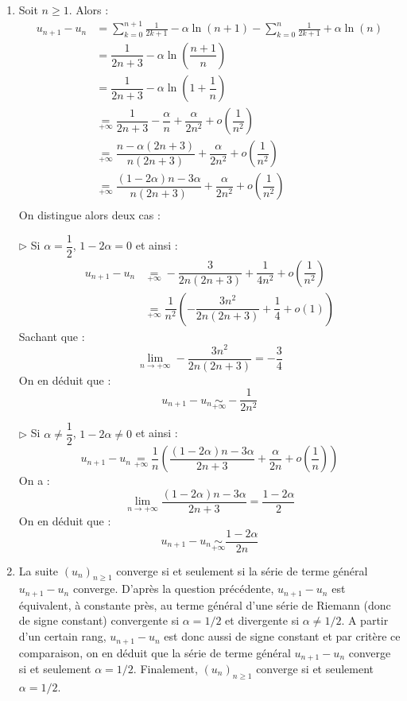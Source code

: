 \documentclass[a4paper,10pt]{report}
\begin{document}
\corr 

\begin{enumerate}
\item Soit $n \geq 1$. Alors :
\begin{align*}
u_{n+1}-u_n & = \sum_{k=0}^{n+1} \frac{1}{2k+1} -  \alpha \ln(n+1) -\sum_{k=0}^n \frac{1}{2k+1} + \alpha \ln(n) \\
& = \dfrac{1}{2n+3} - \alpha \ln \left( \dfrac{n+1}{n} \right) \\
& = \dfrac{1}{2n+3} - \alpha \ln \left( 1+ \dfrac{1}{n} \right) \\
& \underset{+ \infty}{=} \dfrac{1}{2n+3} - \dfrac{\alpha}{n}  + \dfrac{\alpha}{2n^2} + o \left( \dfrac{1}{n^2} \right) \\
& \underset{+ \infty}{=} \dfrac{n- \alpha(2n+3)}{n(2n+3)}  +\dfrac{\alpha}{2n^2} + o \left( \dfrac{1}{n^2} \right) \\
& \underset{+ \infty}{=} \dfrac{(1-2 \alpha)n - 3 \alpha}{n(2n+3)}  +\dfrac{\alpha}{2n^2} + o \left( \dfrac{1}{n^2} \right) \\
\end{align*}
On distingue alors deux cas :

\medskip

\noindent $\rhd$ Si $\alpha = \dfrac{1}{2}$, $1-2 \alpha=0$ et ainsi :
\begin{align*}
 u_{n+1}-u_n & \underset{+ \infty}{=} -\dfrac{3}{2n(2n+3)}  + \dfrac{1}{4n^2} + o \left( \dfrac{1}{n^2} \right) \\
 & \underset{+ \infty}{=} \dfrac{1}{n^2} \left( -\dfrac{3n^2}{2n(2n+3)}  + \dfrac{1}{4} + o (1) \right) 
 \end{align*}
 Sachant que :
 $$ \lim_{n \rightarrow + \infty} -\dfrac{3n^2}{2n(2n+3)} = - \dfrac{3}{4}$$
 On en déduit que :
 $$ u_{n+1}-u_n \underset{+ \infty}{\sim} - \dfrac{1}{2n^2}$$

\medskip

\noindent $\rhd$ Si $\alpha \neq \dfrac{1}{2}$, $1-2 \alpha \neq 0$ et ainsi :
$$
 u_{n+1}-u_n  \underset{+ \infty}{=} \dfrac{1}{n} \left( \dfrac{(1-2 \alpha)n - 3 \alpha}{2n+3}  +\dfrac{\alpha}{2n} + o \left( \dfrac{1}{n} \right)\right)
 $$
On a :
$$ \lim_{n \rightarrow + \infty} \dfrac{(1-2 \alpha)n - 3 \alpha}{2n+3}  = \dfrac{1-2 \alpha}{2}$$
On en déduit que :
$$ u_{n+1}-u_n \underset{+ \infty}{\sim}  \dfrac{1-2 \alpha}{2n}$$
\item La suite $(u_n)_{n \geq 1}$ converge si et seulement si la série de terme général $u_{n+1}-u_n$ converge. D'après la question précédente, $u_{n+1}-u_n$ est équivalent, à constante près, au terme général d'une série de Riemann (donc de signe constant) convergente si $\alpha = 1/2$ et divergente si $\alpha \neq 1/2$. A partir d'un certain rang, $u_{n+1}-u_n$ est donc aussi de signe constant et par critère ce comparaison, on en déduit que la série de terme général $u_{n+1}-u_n$ converge si et seulement $\alpha =1/2$. Finalement, $(u_n)_{n \geq 1}$ converge si et seulement $\alpha = 1/2$.
\end{enumerate}
\end{document}
